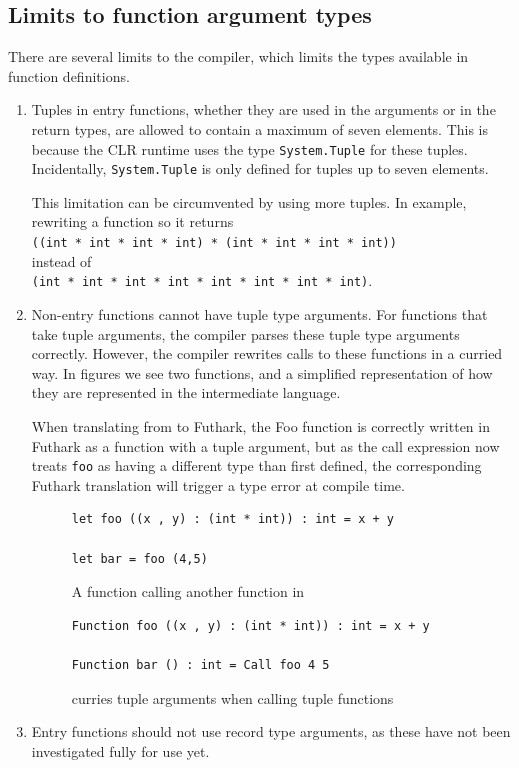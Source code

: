 \subsection{Limits to function argument types}
\label{noteonfsharktypes}
There are several limits to the \fsharp{} compiler, which limits the types
available in function definitions.\\
\begin{enumerate}
\item Tuples in entry functions, whether they are used in the arguments or in the
return types, are allowed to contain a maximum of seven elements. This is
because the CLR runtime uses the type \texttt{System.Tuple} for these tuples.
Incidentally, \texttt{System.Tuple} is only defined for tuples up to seven
elements.

This limitation can be circumvented by using more tuples. In example, rewriting
a function so it returns \\
\texttt{((int * int * int * int) * (int * int * int * int))}\\
instead of\\
\texttt{(int * int * int * int * int * int * int * int)}.

\item Non-entry functions cannot have tuple type arguments.
  For functions that take tuple arguments, the \fsharp{} compiler parses these
  tuple type arguments correctly.
  However, the \fsharp{} compiler rewrites calls to these functions in a curried
  way. In figures  we see two \fsharp{}
  functions, and a simplified representation of how they are represented in the
  \fsharp{} intermediate language.

  When translating from \fshark{} to Futhark, the Foo function is correctly
  written in Futhark as a function with a tuple argument, but as the call
  expression now treats \texttt{foo} as having a different type than first
  defined, the corresponding Futhark translation will trigger a type error at
  compile time.

\begin{figure}[H]
\centering
\begin{verbatim}
let foo ((x , y) : (int * int)) : int = x + y

let bar = foo (4,5)
\end{verbatim}
\caption{A function calling another function in \fsharp{}}
    \label{fig:astcurried}
    \end{figure}
\begin{figure}[H]
\begin{verbatim}
Function foo ((x , y) : (int * int)) : int = x + y

Function bar () : int = Call foo 4 5
\end{verbatim}
    \caption{\fsharp{} curries tuple arguments when calling tuple functions}
    \label{fig:astcurried'}
  \end{figure}

\item Entry functions should not use record type arguments, as these have not
  been investigated fully for \fshark{} use yet.
\end{enumerate}

